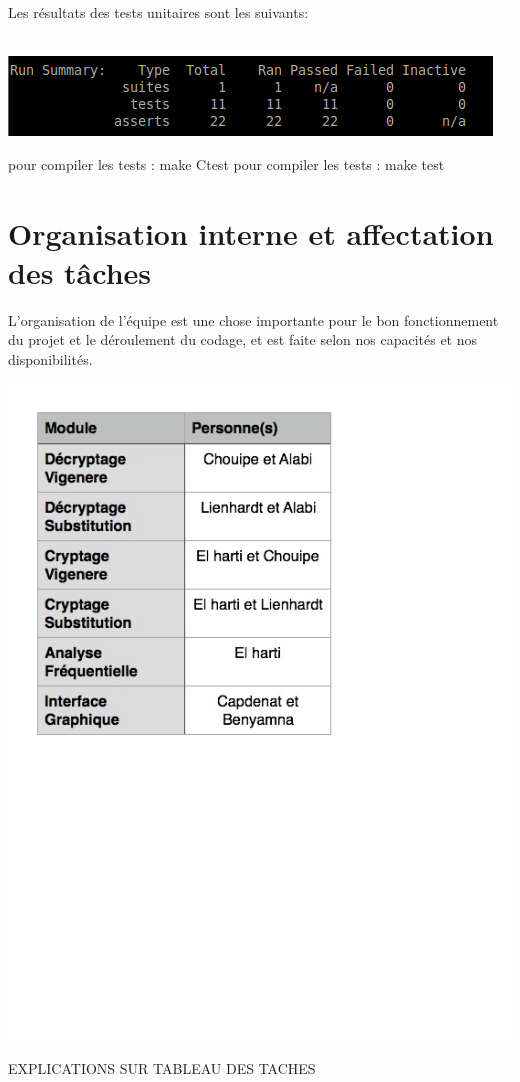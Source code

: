 \documentclass[a4]{article}
\begin{document}
  
Les résultats des tests unitaires sont les suivants:\\ \\ 
		 \begin{center}\includegraphics[scale=0.5]{Capture.png}\end{center}
	pour compiler les tests : make Ctest
	pour compiler les tests : make test
	\section{Organisation interne et affectation des tâches}
	L'organisation de l'équipe est une chose importante pour le bon fonctionnement du
  projet et le déroulement du codage, et est faite selon nos capacités et nos disponibilités.  \\ 
		 \begin{center}\includegraphics[scale=0.5]{tableau_tache_final.jpg}\end{center}
		 EXPLICATIONS SUR TABLEAU DES TACHES \\ 
		
\end{document}
